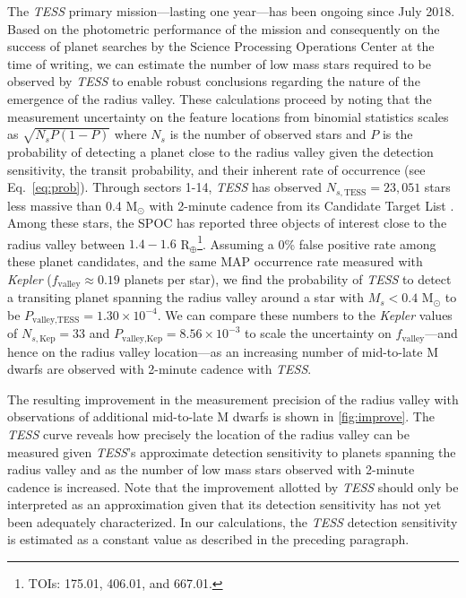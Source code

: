 \documentclass[twocolumn]{emulateapj}
\newcommand{\kepler}[1]{\emph{Kepler}#1}
\newcommand{\tess}[1]{\emph{TESS}#1}
\begin{document}
The \tess{} primary mission---lasting one year---has been ongoing since July 2018. 
Based on the photometric performance of the mission and consequently on the success of planet searches by the
Science Processing Operations Center \citep[SPOC;][]{jenkins16,twicken18,li18} at the time of writing,
we can estimate the number of low mass stars required to be observed
by \tess{} to enable robust conclusions regarding the nature of the emergence of the radius valley. These calculations
proceed by noting that the measurement uncertainty on the feature locations from binomial statistics scales as
$\sqrt{N_sP(1-P)}$ where $N_s$ is the number of observed stars and $P$ is the probability of detecting a planet close to
the radius valley 
given the detection sensitivity, the transit probability, and their inherent rate of occurrence (see Eq.~\ref{eq:prob}).
Through sectors 1-14, \tess{} has observed $N_{s,\text{TESS}} = 23,051$ stars less massive than 0.4 M$_{\odot}$
with 2-minute cadence from its Candidate Target List \citep[CTL;][]{stassun19}.
Among these stars, the SPOC has reported three objects of interest close to the radius valley
between $1.4-1.6$ R$_{\oplus}$\footnote{TOIs: 175.01, 406.01, and 667.01.}. 
Assuming a 0\% false positive rate
among these planet candidates, and the same MAP occurrence rate measured with \kepler{}
($f_{\text{valley}}\approx 0.19$ planets per star), we find the probability of \tess{} to detect a transiting planet
spanning the radius valley around a star with $M_s<0.4$ M$_{\odot}$ to be 
$P_{\text{valley,TESS}}=1.30 \times 10^{-4}$. We can compare these numbers to the \kepler{} values of $N_{s,\text{Kep}}=33$ and
$P_{\text{valley,Kep}}=8.56\times 10^{-3}$ to scale the uncertainty on $f_{\text{valley}}$---and hence on the radius
valley location---as an increasing number of mid-to-late M dwarfs are observed with 2-minute cadence with \tess{.}

The resulting improvement in the measurement precision of the radius valley with observations of additional mid-to-late
M dwarfs is shown in \autoref{fig:improve}.
The \tess{} curve reveals how precisely the location of the radius valley can be measured given \tess{'s} approximate 
detection sensitivity to planets spanning the radius valley and as the number of low mass stars observed with 2-minute
cadence is increased. Note that the improvement allotted by \tess{} should only be interpreted as an
approximation given that its detection sensitivity has not yet been adequately characterized. In our calculations, the
\tess{} detection sensitivity is estimated as a constant value as described in the preceding paragraph. 
\end{document}
